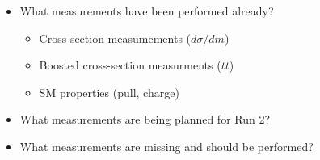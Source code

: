 \label{measurements}

\begin{itemize}
\item What measurements have been performed already?
\begin{itemize}
	\item Cross-section measumements ($d\sigma/ d m$)
	\item Boosted cross-section measurments ($t\bar{t}$)
	\item SM properties (pull, charge)
\end{itemize}
\item What measurements are being planned for Run 2?
\item What measurements are missing and should be performed?
\end{itemize}